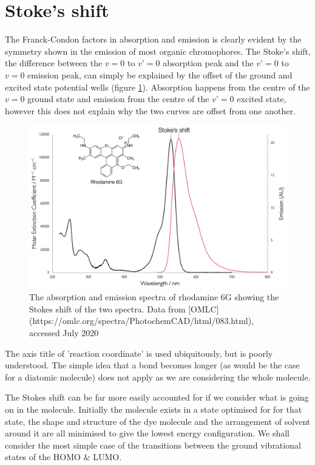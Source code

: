 \documentclass[
]{book}
\begin{document}
\hypertarget{sec:stoke}{%
\section{Stoke's shift}\label{sec:stoke}}

The Franck-Condon factors in absorption and emission is clearly evident by the symmetry shown in the emission of most organic chromophores. The Stoke's shift, the difference between the \(v=0\) to \(v’=0\) absorption peak and the \(v’=0\) to \(v=0\) emission peak, can simply be explained by the offset of the ground and excited state potential wells (figure \ref{fig:stokesspectrum}). Absorption happens from the centre of the \(v=0\) ground state and emission from the centre of the \(v’=0\) excited state, however this does not explain why the two curves are offset from one another.

\begin{figure}

{\centering \includegraphics[width=0.7\linewidth]{images/stokesspectrum} 

}

\caption{The absorption and emission spectra of rhodamine 6G showing the Stokes shift of the two spectra. Data from [OMLC] (https://omlc.org/spectra/PhotochemCAD/html/083.html), accessed July 2020}\label{fig:stokesspectrum}
\end{figure}

The axis title of 'reaction coordinate' is used ubiquitously, but is poorly understood. The simple idea that a bond becomes longer (as would be the case for a diatomic molecule) does not apply as we are considering the whole molecule.

The Stokes shift can be far more easily accounted for if we consider what is going on in the molecule. Initially the molecule exists in a state optimised for for that state, the shape and structure of the dye molecule and the arrangement of solvent around it are all minimised to give the lowest energy configuration. We shall consider the most simple case of the transitions between the ground vibrational states of the HOMO \& LUMO.
\end{document}
